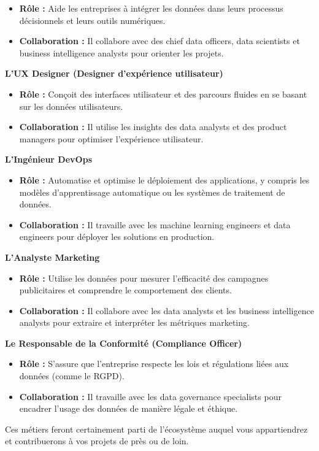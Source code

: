 \documentclass[
  letterpaper,
  DIV=11,
  numbers=noendperiod]{scrartcl}
\providecommand{\tightlist}{%
  \setlength{\itemsep}{0pt}\setlength{\parskip}{0pt}}\usepackage{longtable,booktabs,array}
\begin{document}
\begin{itemize}
\tightlist
\item
  \textbf{Rôle :} Aide les entreprises à intégrer les données dans leurs
  processus décisionnels et leurs outils numériques.
\item
  \textbf{Collaboration :} Il collabore avec des chief data officers,
  data scientists et business intelligence analysts pour orienter les
  projets.
\end{itemize}

\textbf{L'UX Designer (Designer d'expérience utilisateur)}

\begin{itemize}
\tightlist
\item
  \textbf{Rôle :} Conçoit des interfaces utilisateur et des parcours
  fluides en se basant sur les données utilisateurs.
\item
  \textbf{Collaboration :} Il utilise les insights des data analysts et
  des product managers pour optimiser l'expérience utilisateur.
\end{itemize}

\textbf{L'Ingénieur DevOps}

\begin{itemize}
\tightlist
\item
  \textbf{Rôle :} Automatise et optimise le déploiement des
  applications, y compris les modèles d'apprentissage automatique ou les
  systèmes de traitement de données.
\item
  \textbf{Collaboration :} Il travaille avec les machine learning
  engineers et data engineers pour déployer les solutions en production.
\end{itemize}

\textbf{L'Analyste Marketing}

\begin{itemize}
\tightlist
\item
  \textbf{Rôle :} Utilise les données pour mesurer l'efficacité des
  campagnes publicitaires et comprendre le comportement des clients.
\item
  \textbf{Collaboration :} Il collabore avec les data analysts et les
  business intelligence analysts pour extraire et interpréter les
  métriques marketing.
\end{itemize}

\textbf{Le Responsable de la Conformité (Compliance Officer)}

\begin{itemize}
\tightlist
\item
  \textbf{Rôle :} S'assure que l'entreprise respecte les lois et
  régulations liées aux données (comme le RGPD).
\item
  \textbf{Collaboration :} Il travaille avec les data governance
  specialists pour encadrer l'usage des données de manière légale et
  éthique.
\end{itemize}

Ces métiers feront certainement parti de l'écosystème auquel vous
appartiendrez et contribuerons à vos projets de près ou de loin.
\end{document}
